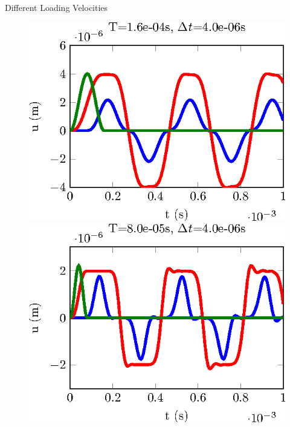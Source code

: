 \documentclass[12pt]{beamer}
\begin{document}
\begin{frame}{Different Loading Velocities}
\begin{figure}
\begin{minipage}{0.24\linewidth}
		\end{minipage}
		\begin{minipage}{0.24\linewidth}
			\includegraphics[width=1\linewidth]{CalculSchem3-T3-tikz.eps}
		\end{minipage}
		\begin{minipage}{0.24\linewidth}
			\includegraphics[width=1\linewidth]{CalculSchem3-T2-tikz.eps}
		\end{minipage}
		\begin{minipage}{0.24\linewidth}

\end{minipage}
\end{figure}
\end{frame}
\end{document}
